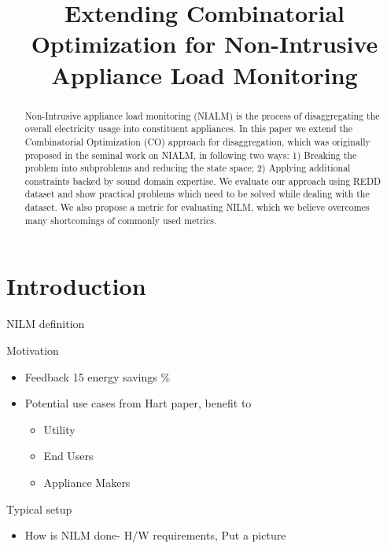 \documentclass[conference]{IEEEtran}
\begin{document}
%
\title{Extending Combinatorial Optimization for Non-Intrusive Appliance Load Monitoring}


\author{
\and
{}
\and
{}
}
\maketitle


\begin{abstract}
Non-Intrusive appliance load monitoring (NIALM) is the process of disaggregating the overall electricity usage into constituent appliances. In this paper we extend the Combinatorial Optimization (CO) approach for disaggregation, which was originally proposed in the seminal work on NIALM, in following two ways: 1) Breaking the problem into subproblems and reducing the state space; 2) Applying additional constraints backed by sound domain expertise. We evaluate our approach using REDD dataset and show practical problems which need to be solved while dealing with the dataset. We also propose a metric for evaluating NILM, which we believe overcomes many shortcomings of commonly used metrics.
\end{abstract}
\IEEEpeerreviewmaketitle



\section{Introduction}
NILM definition \cite{hart}

Motivation
\begin{itemize}
\item Feedback 15 energy savings \% \cite{darby}
\item Potential use cases from Hart paper, benefit to
\begin{itemize}
\item Utility
\item End Users
\item Appliance Makers
\end{itemize}
\end{itemize}
Typical setup
\begin{itemize}
\item How is NILM done- H/W requirements, Put a picture
\end{itemize}
\end{document}
